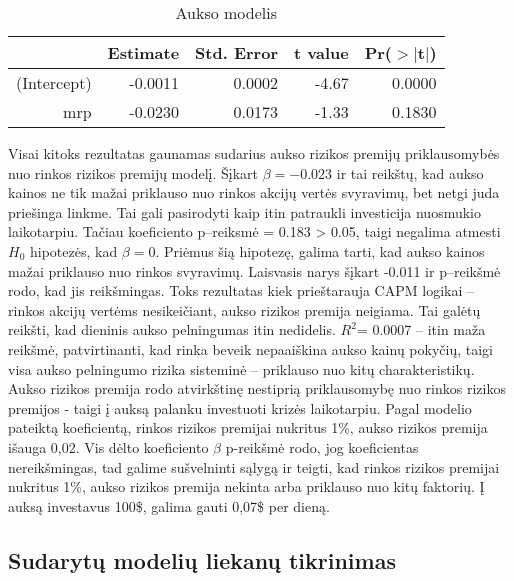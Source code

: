 \documentclass[12pt, a14paper, lithuanian]{article}
\begin{document}
\begin{table}[ht]
\begin{center}
\begin{tabular}{rrrrr}
  \hline
 & Estimate & Std. Error & t value & Pr($>$$|$t$|$) \\ 
  \hline
(Intercept) & -0.0011 & 0.0002 & -4.67 & 0.0000 \\ 
  mrp & -0.0230 & 0.0173 & -1.33 & 0.1830 \\ 
   \hline
\end{tabular}
\end{center}
\caption{Aukso modelis}
\end{table}

Visai kitoks rezultatas gaunamas sudarius aukso rizikos premijų priklausomybės nuo rinkos rizikos premijų modelį.
Šįkart $\beta=-0.023$ ir tai reikštų, kad aukso kainos ne tik mažai priklauso nuo rinkos akcijų vertės svyravimų,
bet netgi juda priešinga linkme. Tai gali pasirodyti kaip itin patraukli investicija nuosmukio laikotarpiu.
Tačiau koeficiento p--reiksmė = 0.183 > 0.05, taigi negalima atmesti $ H_0 $ hipotezės, kad $\beta=0 $.
Priėmus šią hipotezę, galima tarti, kad aukso kainos mažai priklauso nuo rinkos svyravimų.
Laisvasis narys šįkart -0.011 ir p--reikšmė rodo, kad jis reikšmingas. Toks rezultatas kiek prieštarauja CAPM logikai -- rinkos akcijų vertėms nesikeičiant, aukso rizikos premija neigiama. Tai galėtų reikšti,
kad dieninis aukso pelningumas itin nedidelis.
$ R^2 $= 0.0007 -- itin maža reikšmė, patvirtinanti, kad rinka beveik nepaaiškina aukso kainų pokyčių, taigi 
visa aukso pelningumo rizika sisteminė -- priklauso nuo kitų charakteristikų. \\


Aukso rizikos premija rodo atvirkštinę nestiprią priklausomybę nuo rinkos rizikos premijos - taigi į auksą palanku investuoti krizės laikotarpiu. Pagal modelio pateiktą koeficientą, rinkos rizikos premijai nukritus 1\%, aukso rizikos premija išauga 0,02. Vis dėlto koeficiento $\beta$ p-reikšmė rodo, jog koeficientas nereikšmingas, tad galime sušvelninti sąlygą ir teigti, kad rinkos rizikos premijai nukritus 1\%, aukso rizikos premija nekinta arba priklauso nuo kitų faktorių. Į auksą investavus 100\$, galima gauti 0,07\$ per dieną.



\subsection{Sudarytų modelių liekanų tikrinimas}
\end{document}
